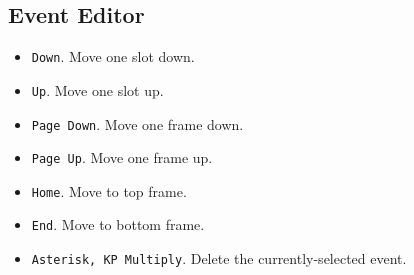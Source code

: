 \subsection{Event Editor}
\label{subsec:kbd_mouse_event_editor}

   \begin{itemize}
      \item \texttt{Down}.  Move one slot down.
      \item \texttt{Up}.  Move one slot up.
      \item \texttt{Page Down}.  Move one frame down.
      \item \texttt{Page Up}.  Move one frame up.
      \item \texttt{Home}.  Move to top frame.
      \item \texttt{End}.  Move to bottom frame.
      \item \texttt{Asterisk, KP Multiply}.  Delete the currently-selected event.
   \end{itemize}

